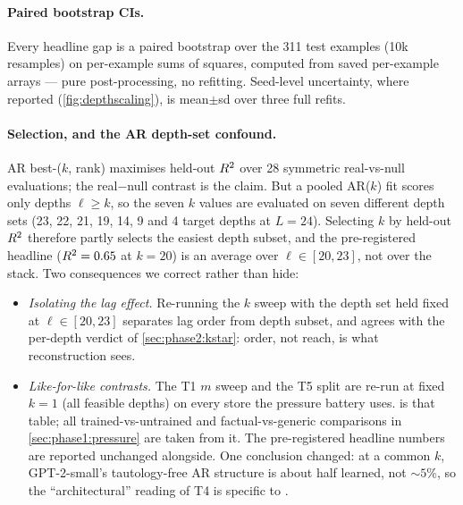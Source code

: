 \paragraph{Paired bootstrap CIs.}
Every headline gap is a paired bootstrap over the 311 test examples (10k
resamples) on per-example sums of squares, computed from saved per-example
arrays --- pure post-processing, no refitting. Seed-level uncertainty, where
reported (\cref{fig:depthscaling}), is mean$\pm$sd over three full refits.

\paragraph{Selection, and the AR depth-set confound.}
AR best-($k$, rank) maximises held-out $R^2$ over 28 symmetric
real-vs-null evaluations; the real$-$null contrast is the claim. But a pooled
AR($k$) fit scores only depths $\ell \ge k$, so the seven $k$ values are
evaluated on seven different depth sets (23, 22, 21, 19, 14, 9 and 4 target
depths at $L{=}24$). Selecting $k$ by held-out $R^2$ therefore partly selects
the easiest depth subset, and the pre-registered headline ($R^2 = 0.65$ at
$k{=}20$) is an average over $\ell \in [20,23]$, not over the stack. Two
consequences we correct rather than hide:

\begin{itemize}
  \item \emph{Isolating the lag effect.} Re-running the $k$ sweep with the
    depth set held fixed at $\ell \in [20,23]$ separates lag order from depth
    subset, and agrees with the per-depth verdict of \cref{sec:phase2:kstar}:
    order, not reach, is what reconstruction sees.
  \item \emph{Like-for-like contrasts.} The T1 $m$ sweep and the T5 split are
    re-run at fixed $k{=}1$ (all feasible depths) on every store the pressure
    battery uses.  is that table; all trained-vs-untrained
    and factual-vs-generic comparisons in \cref{sec:phase1:pressure} are taken
    from it. The pre-registered headline numbers are reported unchanged
    alongside. One conclusion changed: at a common $k$, GPT-2-small's
    tautology-free AR structure is about half learned, not ${\sim}5\%$, so the
    ``architectural'' reading of T4 is specific to \pythia{}.
\end{itemize}

